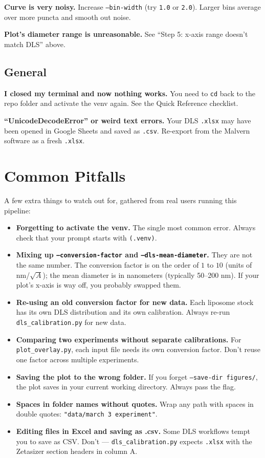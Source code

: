 \documentclass[11pt]{article}
\newcommand{\code}[1]{\texttt{#1}}
\begin{document}
\textbf{Curve is very noisy.} Increase \code{--bin-width} (try
\code{1.0} or \code{2.0}). Larger bins average over more puncta and
smooth out noise.

\textbf{Plot's diameter range is unreasonable.} See ``Step 5: x-axis
range doesn't match DLS'' above.

\subsection{General}

\textbf{I closed my terminal and now nothing works.} You need to
\code{cd} back to the repo folder and activate the venv again. See
the Quick Reference checklist.

\textbf{``UnicodeDecodeError'' or weird text errors.} Your DLS
\code{.xlsx} may have been opened in Google Sheets and saved as
\code{.csv}. Re-export from the Malvern software as a fresh
\code{.xlsx}.

\section{Common Pitfalls}

A few extra things to watch out for, gathered from real users running
this pipeline:

\begin{itemize}[leftmargin=*]
    \item \textbf{Forgetting to activate the venv.} The single most
    common error. Always check that your prompt starts with
    \code{(.venv)}.
    \item \textbf{Mixing up \code{--conversion-factor} and
    \code{--dls-mean-diameter}.} They are not the same number. The
    conversion factor is on the order of $1$ to $10$ (units of
    nm/$\sqrt{A}$); the mean diameter is in nanometers (typically
    50--200 nm). If your plot's x-axis is way off, you probably
    swapped them.
    \item \textbf{Re-using an old conversion factor for new data.}
    Each liposome stock has its own DLS distribution and its own
    calibration. Always re-run \code{dls\_calibration.py} for new
    data.
    \item \textbf{Comparing two experiments without separate
    calibrations.} For \code{plot\_overlay.py}, each input file
    needs its own conversion factor. Don't reuse one factor across
    multiple experiments.
    \item \textbf{Saving the plot to the wrong folder.} If you
    forget \code{--save-dir figures/}, the plot saves in your
    current working directory. Always pass the flag.
    \item \textbf{Spaces in folder names without quotes.} Wrap any
    path with spaces in double quotes:
    \code{"data/march 3 experiment"}.
    \item \textbf{Editing files in Excel and saving as .csv.} Some
    DLS workflows tempt you to save as CSV. Don't ---
    \code{dls\_calibration.py} expects \code{.xlsx} with the
    Zetasizer section headers in column A.
\end{itemize}
\end{document}
